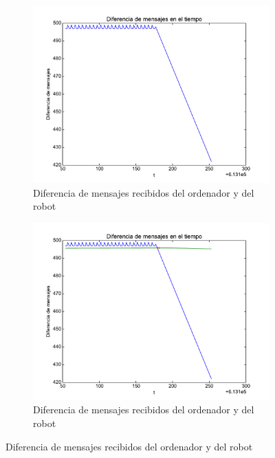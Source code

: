 \begin{figure}[]
	\centering
	\begin{subfigure}[b]{0.45\textwidth}
		\includegraphics[width=\linewidth]{imagenes/desarrollo/diferenciadetalle.pdf}
		\caption{Diferencia de mensajes recibidos del ordenador y del robot}
		\label{fig:desarrollo/diferenciadetalle}
	\end{subfigure}
	\begin{subfigure}[b]{0.45\textwidth}
		\includegraphics[width=\linewidth]{imagenes/desarrollo/diferenciafiltdetalle.pdf}
		\caption{Diferencia de mensajes recibidos del ordenador y del robot}
		\label{fig:desarrollo/diferenciadetallefilt}
	\end{subfigure}
\end{figure}

